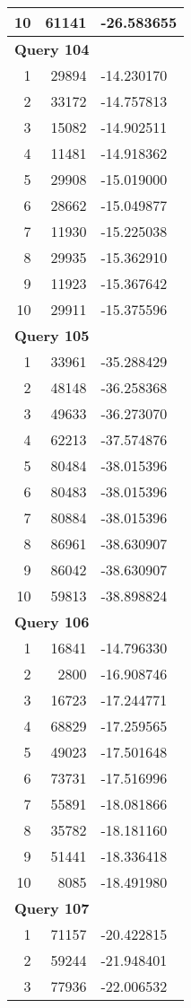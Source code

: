 \begin{longtable}[{p}]{@{}rrp{}@{}}
10 & 61141 & -26.583655 \\
\midrule
\multicolumn{3}{l}{\bfseries Query 104} \\
1 & 29894 & -14.230170 \\
2 & 33172 & -14.757813 \\
3 & 15082 & -14.902511 \\
4 & 11481 & -14.918362 \\
5 & 29908 & -15.019000 \\
6 & 28662 & -15.049877 \\
7 & 11930 & -15.225038 \\
8 & 29935 & -15.362910 \\
9 & 11923 & -15.367642 \\
10 & 29911 & -15.375596 \\
\midrule
\multicolumn{3}{l}{\bfseries Query 105} \\
1 & 33961 & -35.288429 \\
2 & 48148 & -36.258368 \\
3 & 49633 & -36.273070 \\
4 & 62213 & -37.574876 \\
5 & 80484 & -38.015396 \\
6 & 80483 & -38.015396 \\
7 & 80884 & -38.015396 \\
8 & 86961 & -38.630907 \\
9 & 86042 & -38.630907 \\
10 & 59813 & -38.898824 \\
\midrule
\multicolumn{3}{l}{\bfseries Query 106} \\
1 & 16841 & -14.796330 \\
2 & 2800 & -16.908746 \\
3 & 16723 & -17.244771 \\
4 & 68829 & -17.259565 \\
5 & 49023 & -17.501648 \\
6 & 73731 & -17.516996 \\
7 & 55891 & -18.081866 \\
8 & 35782 & -18.181160 \\
9 & 51441 & -18.336418 \\
10 & 8085 & -18.491980 \\
\midrule
\multicolumn{3}{l}{\bfseries Query 107} \\
1 & 71157 & -20.422815 \\
2 & 59244 & -21.948401 \\
3 & 77936 & -22.006532 \\

\end{longtable}
